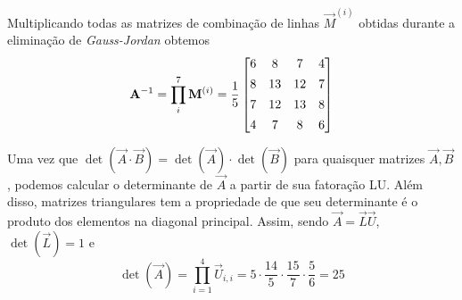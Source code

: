 \documentclass{homework}
\begin{document}
		
		
	
	Multiplicando todas as matrizes de combinação de linhas $\vec{M}^{(i)}$ obtidas durante a eliminação de \textit{Gauss-Jordan} obtemos
		$$\vec{A}^{-1} = \prod_{i}^{7} \vec{M}^{(i)} = \frac{1}{5}\left[\begin{array}{@{}cccc@{}}
		6 & 8 & 7 & 4\\[1ex]
		8 & 13 & 12 & 7\\[1ex]
		7 & 12 & 13 & 8\\[1ex]
		4 & 7 & 8 & 6
		\end{array}\right]$$
	
	
	Uma vez que $\det\left(\vec{A} \cdot \vec{B}\right) = \det \left(\vec{A}\right) \cdot \det \left(\vec{B}\right)$ para quaisquer matrizes $\vec{A}, \vec{B}$, podemos calcular o determinante de $\vec{A}$ a partir de sua fatoração LU. Além disso, matrizes triangulares tem a propriedade de que seu determinante é o produto dos elementos na diagonal principal. Assim, sendo $\vec{A} = \vec{L}\vec{U}$, $\det \left(\vec{L}\right) = 1$ e 
		$$ \det\left(\vec{A}\right) = \prod_{i = 1}^{4} \vec{U}_{i, i} = 5 \cdot \frac{14}{5} \cdot  \frac{15}{7} \cdot \frac{5}{6} = 25 $$
		
	
\end{document}
